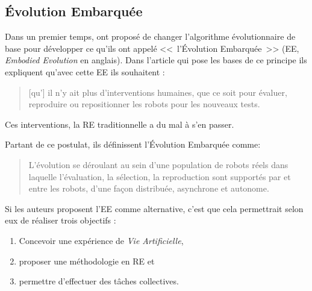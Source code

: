 \subsection{\'Evolution Embarquée}

Dans un premier temps, \cite{watson02embodiedevolutiondistributingevolutionaryalgorithmpopulationrobots} ont proposé de changer l'algorithme évolutionnaire de base pour développer ce qu'ils ont appelé <<~l'\'Evolution Embarquée~>> (EE, \emph{Embodied Evolution} en anglais). Dans l'article qui pose les bases de ce principe ils expliquent qu'avec cette EE ils souhaitent :

\begin{quote}

   [qu'] il n'y ait plus d'interventions humaines, que ce soit pour évaluer, reproduire ou repositionner les robots pour les nouveaux tests.\\

   \citep[p.~1]{watson02embodiedevolutiondistributingevolutionaryalgorithmpopulationrobots}

\end{quote}

Ces interventions, la RE traditionnelle a du mal à s'en passer.

Partant de ce postulat, ils définissent l'\'Evolution Embarquée comme:

\begin{quotation}

   L'évolution se déroulant au sein d'une population de robots réels dans laquelle l'évaluation, la sélection, la reproduction sont supportés par et entre les robots, d'une façon distribuée, asynchrone et autonome.\\

   \citep[p.~2]{watson02embodiedevolutiondistributingevolutionaryalgorithmpopulationrobots}

\end{quotation}

Si les auteurs proposent l'EE comme alternative, c'est que cela permettrait selon eux de réaliser trois objectifs :

\begin{enumerate}

\item Concevoir une expérience de \emph{Vie Artificielle},

\item proposer une méthodologie en RE et

\item permettre d'effectuer des tâches collectives.

\end{enumerate}

